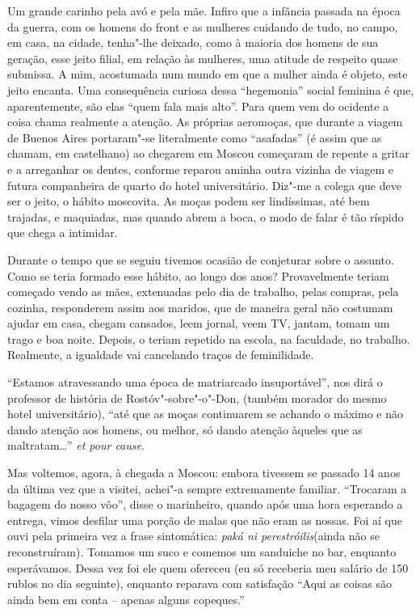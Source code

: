 Um grande carinho pela avó e pela mãe. Infiro que a infância passada na
época da guerra, com os homens do front e as mulheres cuidando de tudo,
no campo, em casa, na cidade, tenha"-lhe deixado, como à maioria dos
homens de sua geração, esse jeito filial, em relação às mulheres, uma
atitude de respeito quase submissa. A mim, acostumada num mundo em que a
mulher ainda é objeto, este jeito encanta. Uma consequência curiosa
dessa ``hegemonia'' social feminina é que, aparentemente, são elas
``quem fala mais alto''. Para quem vem do ocidente a coisa chama
realmente a atenção. As próprias aeromoças, que durante a viagem de
Buenos Aires portaram"-se literalmente como ``asafadas'' (é assim que as
chamam, em castelhano) ao chegarem em Moscou começaram de repente a
gritar e a arreganhar os dentes, conforme reparou aminha outra vizinha
de viagem e futura companheira de quarto do hotel universitário. Diz"-me
a colega que deve ser o jeito, o hábito moscovita. As moças podem ser
lindíssimas, até bem trajadas, e maquiadas, mas quando abrem a boca, o
modo de falar é tão ríspido que chega a intimidar.

Durante o tempo que se seguiu tivemos ocasião de conjeturar sobre o
assunto. Como se teria formado esse hábito, ao longo dos anos?
Provavelmente teriam começado vendo as mães, extenuadas pelo dia de
trabalho, pelas compras, pela cozinha, responderem assim aos maridos,
que de maneira geral não costumam ajudar em casa, chegam cansados, leem
jornal, veem TV, jantam, tomam um trago e boa noite. Depois, o teriam
repetido na escola, na faculdade, no trabalho. Realmente, a igualdade
vai cancelando traços de feminilidade.

``Estamos atravessando uma época de matriarcado insuportável'', nos dirá
o professor de história de Rostóv"-sobre"-o"-Don, (também morador do mesmo
hotel universitário), ``até que as moças continuarem se achando o máximo
e não dando atenção aos homens, ou melhor, só dando atenção àqueles que
as maltratam\ldots{}'' \emph{et pour cause}.

Mas voltemos, agora, à chegada a Moscou: embora tivessem se passado 14
anos da última vez que a visitei, achei"-a sempre extremamente familiar.
``Trocaram a bagagem do nosso vôo'', disse o marinheiro, quando após uma
hora esperando a entrega, vimos desfilar uma porção de malas que não
eram as nossas. Foi aí que ouvi pela primeira vez a frase sintomática:
\emph{paká ni perestróilis}(ainda não se reconstruíram). Tomamos um suco
e comemos um sanduiche no bar, enquanto esperávamos. Dessa vez foi ele
quem ofereceu (eu só receberia meu salário de 150 rublos no dia
seguinte), enquanto reparava com satisfação ``Aqui as coisas são ainda
bem em conta -- apenas alguns copeques.''

